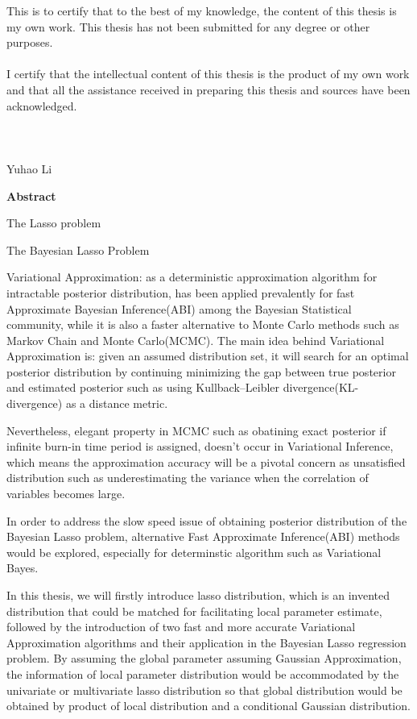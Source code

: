 \noindent This is to certify that to the best of my knowledge, the content of this thesis is my own work. This thesis has not been submitted for any degree or other purposes.\\
\\
\noindent I certify that the intellectual content of this thesis is the product of my own work and that all the assistance received in preparing this thesis and sources have been acknowledged.\\
\\
\\
\\
Yuhao Li

\pagebreak
\hspace{0pt}

\begin{center}
    \textbf{\large Abstract }\\
    \vspace{0.5cm}
\end{center}
The Lasso problem

The Bayesian Lasso Problem


Variational Approximation: as a deterministic approximation algorithm for intractable posterior distribution, has been applied prevalently for fast Approximate Bayesian Inference(ABI) among the Bayesian Statistical community, while it is also a faster alternative to Monte Carlo methods such as Markov Chain and Monte Carlo(MCMC).
The main idea behind Variational Approximation is: given an assumed distribution set, it will search for an optimal posterior distribution by continuing minimizing the gap between true posterior and estimated posterior such as using Kullback–Leibler divergence(KL-divergence) as a distance metric.

Nevertheless, elegant property in MCMC such as obatining exact posterior if infinite burn-in time period is assigned, doesn't occur in Variational Inference, which means the approximation accuracy will be a pivotal concern as unsatisfied distribution such as underestimating the variance when the correlation of variables becomes large. 

In order to address the slow speed issue of obtaining posterior distribution of the Bayesian Lasso problem, alternative Fast Approximate Inference(ABI) methods would be explored, especially for determinstic algorithm such as Variational Bayes.

 In this thesis, we will firstly introduce lasso distribution, which is an invented distribution that could be matched for facilitating local parameter estimate, followed by the introduction of two fast and more accurate Variational Approximation algorithms and their application in the Bayesian Lasso regression problem. By assuming the global parameter assuming Gaussian Approximation, the information of local parameter distribution would be accommodated by the univariate or multivariate lasso distribution so that global distribution would be obtained by product of local distribution and a conditional Gaussian distribution.



